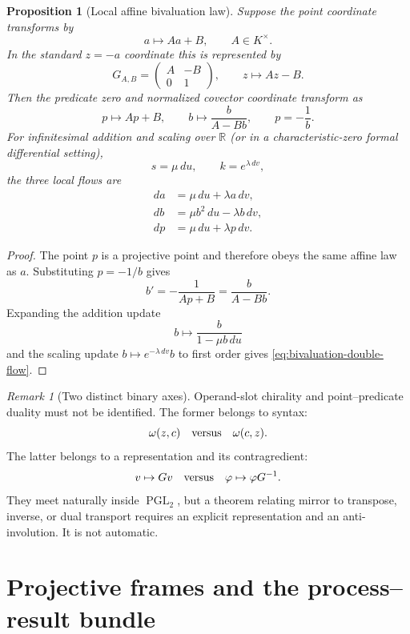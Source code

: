 \documentclass[11pt]{article}
\newtheorem{proposition}[theorem]{Proposition}
\theoremstyle{definition}
\theoremstyle{remark}
\newtheorem{remark}[theorem]{Remark}
\newcommand{\PGL}{\operatorname{PGL}}
\begin{document}
\begin{proposition}[Local affine bivaluation law]
Suppose the point coordinate transforms by
\[
a\longmapsto Aa+B,\qquad A\in K^\times.
\]
In the standard \(z=-a\) coordinate this is represented by
\[
G_{A,B}=\begin{pmatrix}A&-B\\0&1\end{pmatrix},
\qquad z\longmapsto Az-B.
\]
Then the predicate zero and normalized covector coordinate transform as
\begin{equation}
p\longmapsto Ap+B,
\qquad
b\longmapsto\frac{b}{A-Bb},
\qquad p=-\frac1b.
\label{eq:bivaluation-affine-law}
\end{equation}
For infinitesimal addition and scaling over \(\mathbb R\) (or in a
characteristic-zero formal differential setting),
\[
s=\mu\,du,\qquad k=e^{\lambda\,dv},
\]
the three local flows are
\begin{equation}
\begin{aligned}
da&=\mu\,du+\lambda a\,dv,\\
db&=\mu b^2\,du-\lambda b\,dv,\\
dp&=\mu\,du+\lambda p\,dv.
\end{aligned}
\label{eq:bivaluation-double-flow}
\end{equation}
\end{proposition}

\begin{proof}
The point \(p\) is a projective point and therefore obeys the same affine law
as \(a\).  Substituting \(p=-1/b\) gives
\[
b'=-\frac1{Ap+B}=\frac{b}{A-Bb}.
\]
Expanding the addition update
\[
b\longmapsto\frac{b}{1-\mu b\,du}
\]
and the scaling update \(b\mapsto e^{-\lambda\,dv}b\) to first order gives
\eqref{eq:bivaluation-double-flow}.
\end{proof}

\begin{remark}[Two distinct binary axes]
Operand-slot chirality and point--predicate duality must not be identified.
The former belongs to syntax:
\[
\omega(z,c)\quad\hbox{versus}\quad\omega(c,z).
\]
The latter belongs to a representation and its contragredient:
\[
v\mapsto Gv\quad\hbox{versus}\quad\varphi\mapsto\varphi G^{-1}.
\]
They meet naturally inside \(\PGL_2\), but a theorem relating mirror to
transpose, inverse, or dual transport requires an explicit representation and
an anti-involution.  It is not automatic.
\end{remark}

\section{Projective frames and the process--result bundle}
\end{document}
